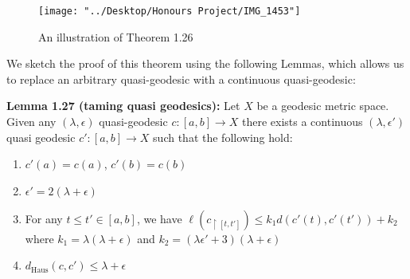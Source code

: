 \documentclass[12pt]{article}
\newcommand{\vs}{\vskip10pt}
\begin{document}
\begin{figure} [H]
	\centering
	\texttt{[image: "../Desktop/Honours Project/IMG\_1453"]}
	\caption{An illustration of Theorem 1.26}
	\label{fig:img1453}
\end{figure}
	
	\vs 
	
	We sketch the proof of this theorem using the following Lemmas, which allows us to replace an arbitrary quasi-geodesic with a continuous quasi-geodesic: 
	
	\vs 
	
	\textbf{Lemma 1.27 (taming quasi geodesics): } Let $X$ be a geodesic metric space. Given any $(\lambda, \epsilon)$ quasi-geodesic $c: [a,b] \rightarrow X$ there exists a continuous $(\lambda, \epsilon')$ quasi geodesic $c': [a,b] \rightarrow X$ such that the following hold: 
	
	\begin{enumerate}[label = (\roman*)]
		\item $c'(a) = c(a)$, $c'(b) = c(b)$
		\item $\epsilon' = 2(\lambda + \epsilon)$
		\item For any $t \leq t' \in [a,b]$, we have $\ell(c_{\restriction [t, t']}) \leq k_1 d(c'(t), c'(t')) + k_2$ where $k_1 = \lambda (\lambda + \epsilon)$ and $k_2 = (\lambda \epsilon' + 3)(\lambda + \epsilon)$
		\item  $d_{\text{Haus}}(c, c') \leq \lambda + \epsilon$
	\end{enumerate} 
\end{document}
